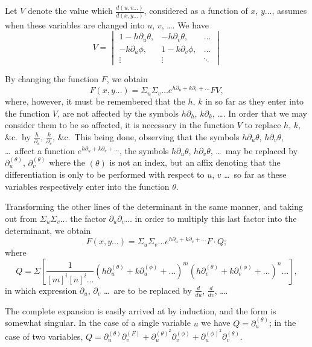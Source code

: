 \documentclass[11pt,a4paper]{article}
\theoremstyle{plain}
\begin{document}
Let $V$ denote the value which $\frac{d(u,v\ldots)}{d(x,y\ldots)}$, considered as a function of $x$, $y \ldots$, assumes when these variables are changed into $u$, $v$, \ldots. We have
\[
V = \begin{vmatrix}
1 - h\partial_u \theta, & -h\partial_v \theta, & \ldots \\
-k\partial_u \phi, & 1 - k\partial_v \phi, & \ldots \\
\vdots & \vdots & \ddots
\end{vmatrix}
\]

By changing the function $F$, we obtain
\[ F(x,y\ldots) = \Sigma_u \Sigma_v \ldots e^{h\partial_u + k\partial_v + \ldots} FV, \]
where, however, it must be remembered that the $h$, $k$ in so far as they enter into the function $V$, are not affected by the symbols $h\partial_h$, $k\partial_k$, \ldots. In order that we may consider them to be so affected, it is necessary in the function $V$ to replace $h$, $k$, \&c.\ by $\frac{h}{\partial_u}$, $\frac{k}{\partial_v}$, \&c.\ This being done, observing that the symbols $h\partial_u \theta$, $h\partial_v \theta$, \ldots\ affect a function $e^{h\partial_u + k\partial_v + \ldots}$, the symbols $h\partial_u \theta$, $h\partial_v \theta$, \ldots\ may be replaced by $\partial_u^{(\theta)}$, $\partial_v^{(\theta)}$ where the $(\theta)$ is not an index, but an affix denoting that the differentiation is only to be performed with respect to $u$, $v$ \ldots\ so far as these variables respectively enter into the function $\theta$.

Transforming the other lines of the determinant in the same manner, and taking out from $\Sigma_u \Sigma_v \ldots$ the factor $\partial_u \partial_v \ldots$ in order to multiply this last factor into the determinant, we obtain
\[ F(x,y\ldots) = \Sigma_u \Sigma_v \ldots e^{h\partial_u + k\partial_v + \ldots} F \cdot Q; \]
where
\[ Q = \Sigma \left[ \frac{1}{[m]^i [n]^i \ldots} (h\partial_u^{(\theta)} + k\partial_u^{(\phi)} + \ldots)^m (h\partial_v^{(\theta)} + k\partial_v^{(\phi)} + \ldots)^n \ldots \right], \]
in which expression $\partial_u$, $\partial_v$ \ldots\ are to be replaced by $\frac{d}{du}$, $\frac{d}{dv}$, \ldots.

The complete expansion is easily arrived at by induction, and the form is somewhat singular. In the case of a single variable $u$ we have $Q = \partial_u^{(\theta)}$; in the case of two variables, $Q = \partial_u^{(\theta)} \partial_v^{(F)} + \partial_u^{(\theta)^2} \partial_v^{(\phi)} + \partial_u^{(\phi)^2} \partial_v^{(\theta)}$.
\end{document}
